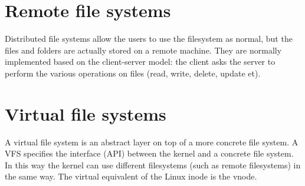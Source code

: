 
\section{Remote file systems}
Distributed file systems allow the users to use the filesystem as normal, but the files and folders are actually stored on a remote machine. They are normally implemented based on the client-server model: the client asks the server to perform the various operations on files (read, write, delete, update et).

\section{Virtual file systems}
A virtual file system is an abstract layer on top of a more concrete file system. A VFS specifies the interface (API) between the kernel and a concrete file system. In this way the kernel can use different filesystems (such as remote filesystems) in the same way. The virtual equivalent of the Linux inode is the vnode.


